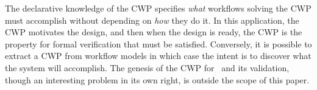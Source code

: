 The declarative knowledge of the CWP specifies \emph{what} workflows solving the CWP must accomplish without depending on \emph{how} they do it. In this application, the CWP motivates the design, and then when the design is ready, the CWP is the property for formal verification that must be satisfied. Conversely, it is possible to extract a CWP from workflow models in which case the intent is to discover what the system will accomplish. The genesis of the CWP for \phware\ and its validation, though an interesting problem in its own right, is outside the scope of this paper.